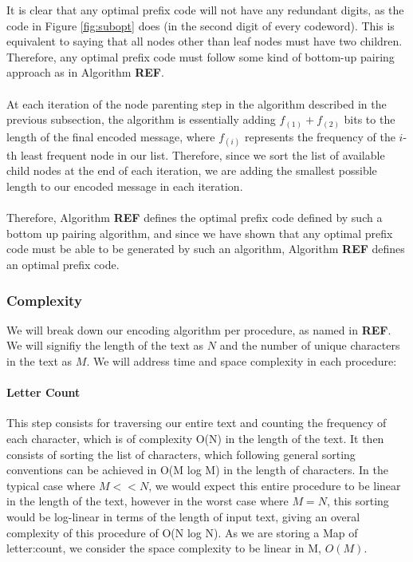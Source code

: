 \documentclass[paper=a4, fontsize=10pt]{article} %
\numberwithin{equation}{section} %
\numberwithin{figure}{section} %
\numberwithin{table}{section} %
\begin{document}
It is clear that any optimal prefix code will not have any redundant digits, as the code in Figure \ref{fig:subopt} does (in the second digit of every codeword). This is equivalent to saying that all nodes other than leaf nodes must have two children. Therefore, any optimal prefix code must follow some kind of bottom-up pairing approach as in Algorithm \textbf{REF}.
\\
\\
At each iteration of the node parenting step in the algorithm described in the previous subsection, the algorithm is essentially adding $f_{(1)} + f_{(2)}$ bits to the length of the final encoded message, where $f_{(i)}$ represents the frequency of the $i$-th least frequent node in our list. Therefore, since we sort the list of available child nodes at the end of each iteration, we are adding the smallest possible length to our encoded message in each iteration.
\\
\\
Therefore, Algorithm \textbf{REF} defines the optimal prefix code defined by such a bottom up pairing algorithm, and since we have shown that any optimal prefix code must be able to be generated by such an algorithm, Algorithm \textbf{REF} defines an optimal prefix code.

\subsubsection{Complexity}

We will break down our encoding algorithm per procedure, as named in \textbf{REF}. We will signifiy the length of the text as $N$ and the number of unique characters in the text as $M$. We will address time and space complexity in each procedure:

\paragraph{Letter Count}
This step consists for traversing our entire text and counting the frequency of each character, which is of complexity O(N) in the length of the text. It then consists of sorting the list of characters, which following general sorting conventions can be achieved in O(M log M) in the length of characters. In the typical case where $M << N$, we would expect this entire procedure to be linear in the length of the text, however in the worst case where $M = N$, this sorting would be log-linear in terms of the length of input text, giving an overal complexity of this procedure of O(N log N). As we are storing a Map of letter:count, we consider the space complexity to be linear in M, $O(M)$.
\end{document}
